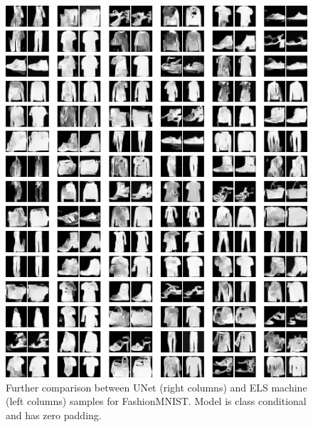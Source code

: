 \documentclass{article}
\theoremstyle{plain}
\theoremstyle{definition}
\theoremstyle{remark}
\begin{document}
\begin{figure}
    \centering
    \includegraphics[width=0.9\linewidth]{fashion_mnist_zeros_samps_unet_m.png}
    \caption{Further comparison between UNet (right columns) and ELS machine (left columns) samples for FashionMNIST. Model is class conditional and has zero padding.}
    \label{fig:fashion_mnist-zeros}
\end{figure}
\end{document}
